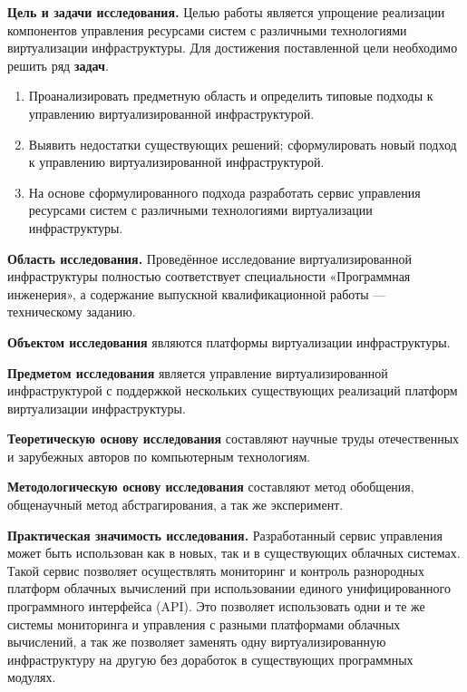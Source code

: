 
\textbf{Цель и задачи исследования.}
Целью работы является упрощение реализации компонентов управления ресурсами систем с различными технологиями виртуализации инфраструктуры.
Для достижения поставленной цели необходимо решить ряд \textbf{задач}.
\begin{enumerate}
    \item Проанализировать предметную область и определить типовые подходы к управлению виртуализированной инфраструктурой.
    \item Выявить недостатки существующих решений; сформулировать новый подход к управлению виртуализированной инфраструктурой.
    \item На основе сформулированного подхода разработать сервис управления ресурсами систем с различными технологиями виртуализации инфраструктуры.
\end{enumerate}

\textbf{Область исследования.}
Проведённое исследование виртуализированной инфраструктуры полностью соответствует специальности «Программная инженерия», а содержание выпускной квалификационной работы --- техническому заданию.

\textbf{Объектом исследования} являются платформы виртуализации инфраструктуры.

\textbf{Предметом исследования} является управление виртуализированной инфраструктурой с поддержкой нескольких существующих реализаций платформ виртуализации инфраструктуры.

\textbf{Теоретическую основу исследования} составляют научные труды отечественных и зарубежных авторов по компьютерным технологиям.

\textbf{Методологическую основу исследования} составляют метод обобщения, общенаучный метод абстрагирования, а так же эксперимент.



\textbf{Практическая значимость исследования.} Разработанный сервис управления может быть использован как в новых, так и в существующих облачных системах.
Такой сервис позволяет осуществлять мониторинг и контроль разнородных платформ облачных вычислений при использовании единого унифицированного программного интерфейса (API).
Это позволяет использовать одни и те же системы мониторинга и управления с разными платформами облачных вычислений, а так же позволяет заменять одну виртуализированную инфраструктуру на другую без доработок в существующих программных модулях.


